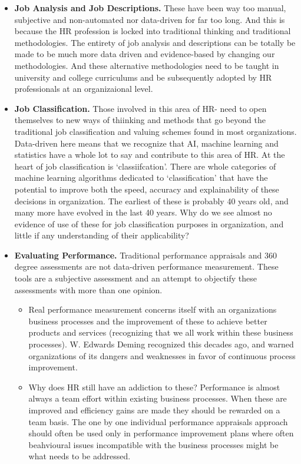 \documentclass[12pt,letterpaper]{article}
\begin{document}
\begin{itemize}
\item
  \textbf{Job Analysis and Job Descriptions.} These have been way too
  manual, subjective and non-automated nor data-driven for far too long.
  And this is because the HR profession is locked into traditional
  thinking and traditional methodologies. The entirety of job analysis
  and descriptions can be totally be made to be much more data driven
  and evidence-based by changing our methodologies. And these
  alternative methodologies need to be taught in university and college
  curriculums and be subsequently adopted by HR professionals at an
  organizaional level.
\item
  \textbf{Job Classification.} Those involved in this area of HR- need
  to open themselves to new ways of thiinking and methods that go beyond
  the traditional job classification and valuing schemes found in most
  organizations. Data-driven here means that we recognize that AI,
  machine learning and statistics have a whole lot to say and contribute
  to this area of HR. At the heart of job classification is
  `classiifcation'. There are whole categories of machine learning
  algorithms dedicated to `classification' that have the potential to
  improve both the speed, accuracy and explainability of these decisions
  in organization. The earliest of these is probably 40 years old, and
  many more have evolved in the last 40 years. Why do we see almost no
  evidence of use of these for job classification purposes in
  organization, and little if any understanding of their applicability?
\item
  \textbf{Evaluating Performance.} Traditional performance appraisals
  and 360 degree assessments are not data-driven performance
  measurement. These tools are a subjective assessment and an attempt to
  objectify these assessments with more than one opinion.

  \begin{itemize}
  \item
    Real performance measurement concerns itself with an organizations
    business processes and the improvement of these to achieve better
    products and services (recognizing that we all work within these
    business processes). W. Edwards Deming recognized this decades ago,
    and warned organizations of its dangers and weaknesses in favor of
    continuous process improvement.
  \item
    Why does HR still have an addiction to these? Performance is almost
    always a team effort within existing business processes. When these
    are improved and efficiency gains are made they should be rewarded
    on a team basis. The one by one individual performance appraisals
    approach should often be used only in performance improvement plans
    where often beahvioural issues incompatible with the business
    processes might be what needs to be addressed.
  \end{itemize}
\end{itemize}
\end{document}

